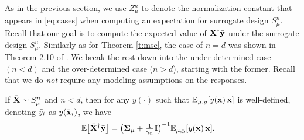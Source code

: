 As in the previous section, we use $Z_\mu^n$ to denote the normalization
constant that appears in \eqref{eq:cases} when computing an expectation
for surrogate design $S_\mu^n$.
Recall that our goal is to compute the expected value of
${\bar{\mathbf X}}^\dagger\bar{\mathbf y}$ under the surrogate design $S_\mu^n$. Similarly as for Theorem
\ref{t:mse}, the case of $n=d$ was shown in Theorem 2.10 of
\cite{correcting-bias-journal}. We break the rest down into the
under-determined case $(n<d)$ and the over-determined case ($n>d$),
starting with the former. Recall that we do \emph{not} require any
modeling assumptions on the responses.
\begin{lemma}\label{l:ridge-under}
If ${\bar{\mathbf X}}\sim S_\mu^n$ and $n<d$, then for any $y(\cdot)$
such that $\mathbb E_{\mu,y}[y(\mathbf x)\,\mathbf x]$ is well-defined,
denoting ${\bar y}_i$ as $y(\bar{\mathbf x}_i)$, we have
\begin{align*}
  \mathbb E\big[{\bar{\mathbf X}}^\dagger \bar{\mathbf y}\big]
  &=
    \big(\mathbf{\Sigma}_\mu+\tfrac1{\gamma_n}\mathbf I\big)^{-1}\mathbb E_{\mu,y}[y(\mathbf x)\,\mathbf x].
\end{align*}
\end{lemma}
